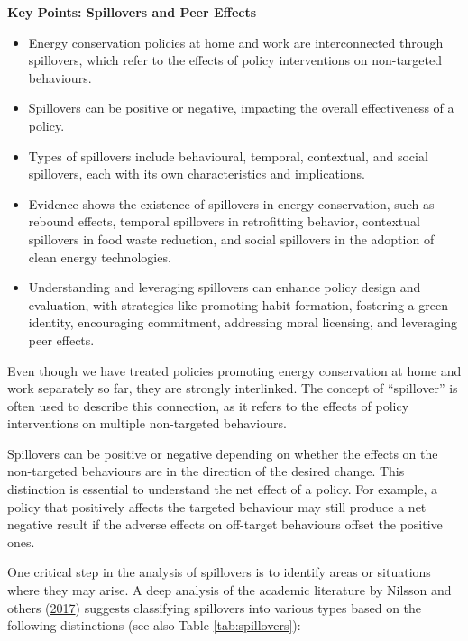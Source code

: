 \documentclass[
  11pt,
]{article}
\begin{document}
\begin{tcolorbox}[colback=yellow!10,colframe=black]
\textbf{Key Points: Spillovers and Peer Effects}
\begin{itemize}[leftmargin=*,labelsep=5mm]
    \item Energy conservation policies at home and work are interconnected through spillovers, which refer to the effects of policy interventions on non-targeted behaviours.
    \item Spillovers can be positive or negative, impacting the overall effectiveness of a policy.
    \item Types of spillovers include behavioural, temporal, contextual, and social spillovers, each with its own characteristics and implications.
    \item Evidence shows the existence of spillovers in energy conservation, such as rebound effects, temporal spillovers in retrofitting behavior, contextual spillovers in food waste reduction, and social spillovers in the adoption of clean energy technologies.
    \item Understanding and leveraging spillovers can enhance policy design and evaluation, with strategies like promoting habit formation, fostering a green identity, encouraging commitment, addressing moral licensing, and leveraging peer effects.
\end{itemize}
\end{tcolorbox}

Even though we have treated policies promoting energy conservation at
home and work separately so far, they are strongly interlinked. The
concept of ``spillover'' is often used to describe this connection, as
it refers to the effects of policy interventions on multiple
non-targeted behaviours.

Spillovers can be positive or negative depending on whether the effects
on the non-targeted behaviours are in the direction of the desired
change. This distinction is essential to understand the net effect of a
policy. For example, a policy that positively affects the targeted
behaviour may still produce a net negative result if the adverse effects
on off-target behaviours offset the positive ones.

One critical step in the analysis of spillovers is to identify areas or
situations where they may arise. A deep analysis of the academic
literature by Nilsson and others
(\protect\hyperlink{ref-nilsson2017spillover}{2017}) suggests
classifying spillovers into various types based on the following
distinctions (see also Table \ref{tab:spillovers}):
\end{document}
